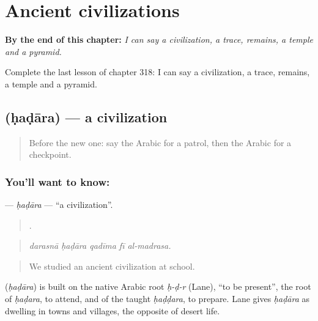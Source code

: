 
\chapter{Ancient civilizations}
\label{ch:ar-ancient-civilizations}

\begin{chapteropening}
\textbf{By the end of this chapter:} \emph{I can say a civilization, a trace, remains, a temple and a pyramid.}

Complete the last lesson of chapter 318: I can say a civilization, a trace, remains, a temple and a pyramid.
\end{chapteropening}

\section[\texorpdfstring{\ar{حضارة} (ḥaḍāra)}{حضارة (ḥaḍāra)}]{ (ḥaḍāra) — a civilization}

\label{lesson:AR-C318-hadara}



\begin{quote}
Before the new one: say the Arabic for a patrol, then the Arabic for a checkpoint.
\end{quote}

\subsection*{You'll want to know: }
\textbf{} — \emph{ḥaḍāra} — \textquotedblleft{}a civilization\textquotedblright{}.

\begin{quote}
    .
\end{quote}

\begin{quote}
\emph{darasnā ḥaḍāra qadīma fī al-madrasa.}
\end{quote}

\begin{quote}
We studied an ancient civilization at school.
\end{quote}

\begin{cousinweb}
\textbf{} (\emph{ḥaḍāra}) is built on the native Arabic root \emph{ḥ-ḍ-r} (Lane), \textquotedblleft{}to be present\textquotedblright{}, the root of \emph{ḥaḍara}, to attend, and of the taught \emph{ḥaḍḍara}, to prepare. Lane gives \emph{ḥaḍāra} as dwelling in towns and villages, the opposite of desert life.
\end{cousinweb}

